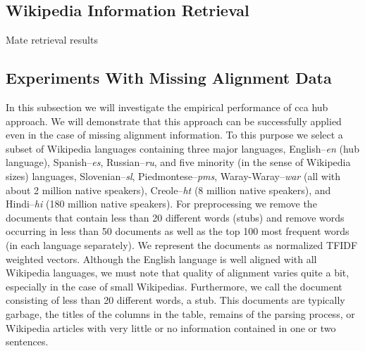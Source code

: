 \documentclass[twoside,11pt]{article}
\newcommand{\oldText}[1]{\textcolor{red}{#1:}\color{blue}}
\begin{document}
\subsection{Wikipedia Information Retrieval}

Mate retrieval results

\subsection{Experiments With Missing Alignment Data}
 In this subsection we will investigate the empirical performance of cca hub approach. We will demonstrate that this approach can be successfully applied even in the case of missing alignment information.
 To this purpose we select a subset of Wikipedia languages containing three major languages, English--\emph{en} (hub language), Spanish--\emph{es}, Russian--\emph{ru}, and five minority (in the sense of Wikipedia sizes) languages, Slovenian--\emph{sl}, Piedmontese--\emph{pms}, Waray-Waray--\emph{war} (all with about 2 million native speakers), Creole--\emph{ht} (8 million native speakers), and Hindi--\emph{hi} (180 million native speakers). For preprocessing we remove the documents that contain less than 20 different words (stubs) and remove words occurring in less than 50 documents as well as the top 100 most frequent words (in each language separately). We represent the documents as normalized TFIDF\cite{Salton88term-weightingapproaches} weighted vectors.
 Although the English language is well aligned with all Wikipedia languages, we must note that quality of alignment varies quite a bit, especially in the case of small Wikipedias.
 Furthermore, we call the document consisting of less than 20 different words, a stub. This documents are typically garbage, the titles of the columns in the table, remains of the parsing process, or Wikipedia articles with very little or no information contained in one or two sentences.
\end{document}
